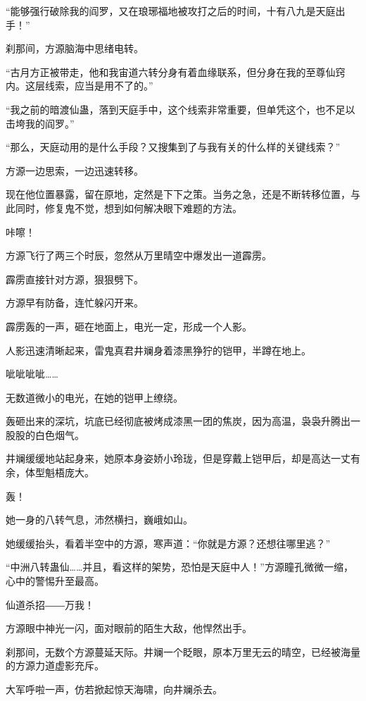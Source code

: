 
\begin{this_body}

“能够强行破除我的阎罗，又在琅琊福地被攻打之后的时间，十有八九是天庭出手！”

刹那间，方源脑海中思绪电转。

“古月方正被带走，他和我宙道六转分身有着血缘联系，但分身在我的至尊仙窍内。这层线索，应当是用不了的。”

“我之前的暗渡仙蛊，落到天庭手中，这个线索非常重要，但单凭这个，也不足以击垮我的阎罗。”

“那么，天庭动用的是什么手段？又搜集到了与我有关的什么样的关键线索？”

方源一边思索，一边迅速转移。

现在他位置暴露，留在原地，定然是下下之策。当务之急，还是不断转移位置，与此同时，修复鬼不觉，想到如何解决眼下难题的方法。

咔嚓！

方源飞行了两三个时辰，忽然从万里晴空中爆发出一道霹雳。

霹雳直接针对方源，狠狠劈下。

方源早有防备，连忙躲闪开来。

霹雳轰的一声，砸在地面上，电光一定，形成一个人影。

人影迅速清晰起来，雷鬼真君井斓身着漆黑狰狞的铠甲，半蹲在地上。

呲呲呲呲……

无数道微小的电光，在她的铠甲上缭绕。

轰砸出来的深坑，坑底已经彻底被烤成漆黑一团的焦炭，因为高温，袅袅升腾出一股股的白色烟气。

井斓缓缓地站起身来，她原本身姿娇小玲珑，但是穿戴上铠甲后，却是高达一丈有余，体型魁梧庞大。

轰！

她一身的八转气息，沛然横扫，巍峨如山。

她缓缓抬头，看着半空中的方源，寒声道：“你就是方源？还想往哪里逃？”

“中洲八转蛊仙……并且，看这样的架势，恐怕是天庭中人！”方源瞳孔微微一缩，心中的警惕升至最高。

仙道杀招――万我！

方源眼中神光一闪，面对眼前的陌生大敌，他悍然出手。

刹那间，无数个方源蔓延天际。井斓一个眨眼，原本万里无云的晴空，已经被海量的方源力道虚影充斥。

大军呼啦一声，仿若掀起惊天海啸，向井斓杀去。


\end{this_body}
